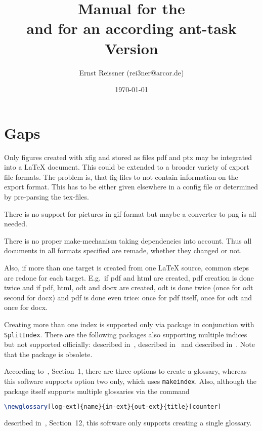 \documentclass[a4paper,12pt,german,english]{book}
\title{Manual for the \artifactId{} \protect\\
  and for an according ant-task \protect\\
Version \strippedVersionID}
\author{Ernst Reissner (rei3ner@arcor.de)}
\date{\today}%
\newcommand{\gls}[1]{#1}
\begin{document}
\maketitle

\tableofcontents
\listoffigures
\listoftables
\lstlistoflistings%











\chapter{Gaps}\label{chap:gaps}

Only figures created with xfig and stored as files pdf and ptx 
may be integrated into a \LaTeX{} document. 
This could be extended to a broader variety of export file formats. 
The problem is, that fig-files to not contain information on the export
format. 
This has to be either given elsewhere in a config file 
or determined by pre-parsing the tex-files. 

There is no support for pictures in \gls{gif}-format 
but maybe a converter to \gls{png} is all needed. 

There is no proper make-mechanism taking dependencies into account. 
Thus all documents in all formats specified are remade, 
whether they changed or not. 

Also, if more than one target is created from one \LaTeX{} source, 
common steps are redone for each target. 
E.g.~if pdf and html are created, 
pdf creation is done twice and if pdf, html, odt and docx are created, 
odt is done twice (once for odt second for docx) 
and pdf is done even trice: 
once for pdf itself, once for odt and once for docx. 

Creating more than one index is supported only 
via package  in conjunction with \texttt{SplitIndex}. 
There are the following packages also supporting multiple indices 
but not supported officially: 
 described in~\cite{IndexP}, 
 described in~\cite{AmsmidxP} and 
 described in~\cite{ImakeidxP}.
Note that the package  is obsolete. 

According to~\cite{GloP}, Section~1, 
there are three options to create a glossary, 
whereas this software supports option two only, 
which uses \texttt{makeindex}. 
Also, although the package  itself 
supports multiple glossaries via the command
%
\begin{lstlisting}[language=TeX, basicstyle=\small]
\newglossary[log-ext]{name}{in-ext}{out-ext}{title}[counter]
\end{lstlisting}
%
described in~\cite{GloP}, Section~12, 
this software only supports creating a single glossary. 
\end{document}
